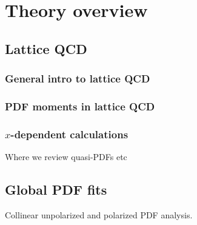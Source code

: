 
\section{Theory overview}


\subsection{Lattice QCD}


\subsubsection{General intro to lattice QCD}


\subsubsection{PDF moments in lattice QCD}


\subsubsection{$x$-dependent calculations}

Where we review quasi-PDFs etc



\subsection{Global PDF fits}

Collinear unpolarized and polarized PDF analysis.
